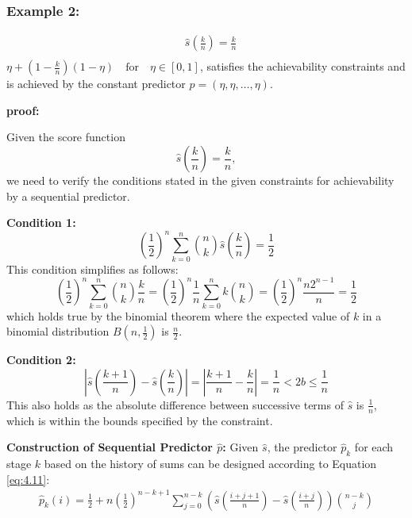 \documentclass[11pt]{article}
\numberwithin{equation}{section}
\theoremstyle{boldStyle}
\begin{document}
\bigbreak

\subsubsection{Example 2:}

\begin{align*}
    &\hat{s} \left( \frac{k}{n} \right)= \frac{k}{n} \\
\end{align*}
$\eta + (1 - \frac{k}{n})(1 - \eta) \quad \text{for} \quad \eta \in [0, 1]$, satisfies the achievability constraints and is achieved by 
the constant predictor $p = (\eta, \eta, \ldots, \eta)$.

\textbf{proof:}

Given the score function 
\[
\hat{s}\left(\frac{k}{n}\right) = \frac{k}{n},
\]
we need to verify the conditions stated in the given constraints for achievability by a sequential predictor.


\textbf{Condition 1:}
\[
\left(\frac{1}{2}\right)^n \sum_{k=0}^n \binom{n}{k} \hat{s} \left(\frac{k}{n}\right) = \frac{1}{2}
\]
This condition simplifies as follows:
\[
\left(\frac{1}{2}\right)^n \sum_{k=0}^n \binom{n}{k} \frac{k}{n} = \left(\frac{1}{2}\right)^n \frac{1}{n} \sum_{k=0}^n k \binom{n}{k} = \left(\frac{1}{2}\right)^n \frac{n 2^{n-1}}{n} = \frac{1}{2}
\]
which holds true by the binomial theorem where the expected value of $k$ in a binomial distribution $B(n, \frac{1}{2})$ is $\frac{n}{2}$.

\textbf{Condition 2:}
\[
\left| \hat{s} \left(\frac{k+1}{n}\right) - \hat{s} \left(\frac{k}{n}\right) \right| = \left| \frac{k+1}{n} - \frac{k}{n} \right| = \frac{1}{n} < 2b \leq \frac{1}{n}
\]
This also holds as the absolute difference between successive terms of $\hat{s}$ is $\frac{1}{n}$, which is within the bounds specified by the constraint.

\bigbreak

\textbf{Construction of Sequential Predictor $\hat{p}$:}
Given $\hat{s}$, the predictor $\hat{p}_k$ for each stage $k$ based on the history of sums can be designed according 
to Equation \ref{eq:4.11}:
\begin{align*}
    \hat{p}_k(i) = \frac{1}{2} + n \left(\frac{1}{2}\right)^{n-k+1} 
    \sum_{j=0}^{n-k} \left(\hat{s} \left( \frac{i+j+1}{n} \right) - \hat{s} \left( \frac{i+j}{n} \right) \right) \binom{n-k}{j}
\end{align*}
\end{document}
